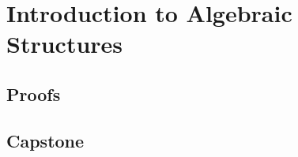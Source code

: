 \chapter{Introduction to Algebraic Structures}


\clearpage


\section*{Proofs}


\section*{Capstone}

